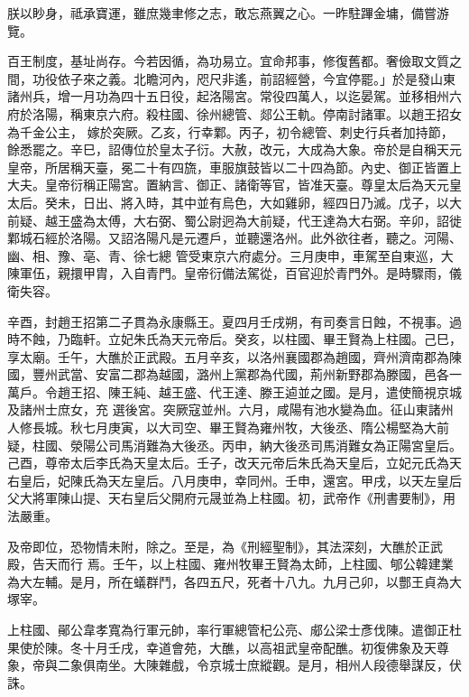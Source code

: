 \begin{pinyinscope}
 朕以眇身，祗承寶運，雖庶幾聿修之志，敢忘燕翼之心。一昨駐蹕金墉，備嘗游覽。



 百王制度，基址尚存。今若因循，為功易立。宜命邦事，修復舊都。奢儉取文質之間，功役依子來之義。北瞻河內，咫尺非遙，前詔經營，今宜停罷。」於是發山東諸州兵，增一月功為四十五日役，起洛陽宮。常役四萬人，以迄晏駕。並移相州六府於洛陽，稱東京六府。殺柱國、徐州總管、郯公王軌。停南討諸軍。以趙王招女為千金公主，
 嫁於突厥。乙亥，行幸鄴。丙子，初令總管、刺史行兵者加持節，餘悉罷之。辛巳，詔傳位於皇太子衍。大赦，改元，大成為大象。帝於是自稱天元皇帝，所居稱天臺，冕二十有四旒，車服旗鼓皆以二十四為節。內史、御正皆置上大夫。皇帝衍稱正陽宮。置納言、御正、諸衛等官，皆准天臺。尊皇太后為天元皇太后。癸未，日出、將入時，其中並有烏色，大如雞卵，經四日乃滅。戊子，以大前疑、越王盛為太傅，大右弼、蜀公尉迥為大前疑，代王達為大右弼。辛卯，詔徙鄴城石經於洛陽。又詔洛陽凡是元遷戶，並聽還洛州。此外欲往者，聽之。河陽、幽、相、豫、亳、青、徐七總
 管受東京六府處分。三月庚申，車駕至自東巡，大陳軍伍，親擐甲胄，入自青門。皇帝衍備法駕從，百官迎於青門外。是時驟雨，儀衛失容。



 辛酉，封趙王招第二子貫為永康縣王。夏四月壬戌朔，有司奏言日蝕，不視事。過時不蝕，乃臨軒。立妃朱氏為天元帝后。癸亥，以柱國、畢王賢為上柱國。己巳，享太廟。壬午，大醮於正武殿。五月辛亥，以洛州襄國郡為趙國，齊州濟南郡為陳國，豐州武當、安富二郡為越國，潞州上黨郡為代國，荊州新野郡為滕國，邑各一萬戶。令趙王招、陳王純、越王盛、代王達、滕王逌並之國。是月，遣使簡視京城及諸州士庶女，充
 選後宮。突厥寇並州。六月，咸陽有池水變為血。征山東諸州人修長城。秋七月庚寅，以大司空、畢王賢為雍州牧，大後丞、隋公楊堅為大前疑，柱國、滎陽公司馬消難為大後丞。丙申，納大後丞司馬消難女為正陽宮皇后。己酉，尊帝太后李氏為天皇太后。壬子，改天元帝后朱氏為天皇后，立妃元氏為天右皇后，妃陳氏為天左皇后。八月庚申，幸同州。壬申，還宮。甲戌，以天左皇后父大將軍陳山提、天右皇后父開府元晟並為上柱國。初，武帝作《刑書要制》，用法嚴重。



 及帝即位，恐物情未附，除之。至是，為《刑經聖制》，其法深刻，大醮於正武殿，告天而行
 焉。壬午，以上柱國、雍州牧畢王賢為太師，上柱國、郇公韓建業為大左輔。是月，所在蟻群鬥，各四五尺，死者十八九。九月己卯，以酆王貞為大塚宰。



 上柱國、鄖公韋孝寬為行軍元帥，率行軍總管杞公亮、郕公梁士彥伐陳。遣御正杜果使於陳。冬十月壬戌，幸道會苑，大醮，以高祖武皇帝配醮。初復佛象及天尊象，帝與二象俱南坐。大陳雜戲，令京城士庶縱觀。是月，相州人段德舉謀反，伏誅。




\end{pinyinscope}
